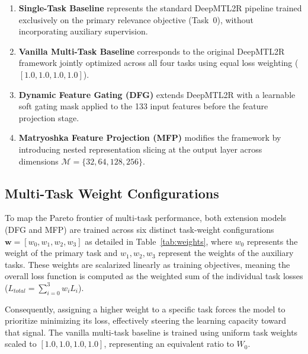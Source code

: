 \begin{enumerate}
    \item \textbf{Single-Task Baseline} represents the
    standard DeepMTL2R pipeline trained exclusively on
    the primary relevance objective (Task~0), without
    incorporating auxiliary supervision.

    \item \textbf{Vanilla Multi-Task Baseline}
    corresponds to the original DeepMTL2R framework
    jointly optimized across all four tasks using equal
    loss weighting ($[1.0, 1.0, 1.0, 1.0]$).

    \item \textbf{Dynamic Feature Gating (DFG)}
    extends DeepMTL2R with a learnable soft gating mask
    applied to the 133 input features before the feature
    projection stage.

    \item \textbf{Matryoshka Feature Projection (MFP)}
    modifies the framework by introducing nested
    representation slicing at the output layer across
    dimensions $\mathcal{M} = \{32, 64, 128, 256\}$.
\end{enumerate}

\subsection{Multi-Task Weight Configurations}

To map the Pareto frontier of multi-task performance, both extension models (DFG and MFP) are trained across six distinct task-weight configurations $\mathbf{w} = [w_0, w_1, w_2, w_3]$ as detailed in Table~\ref{tab:weights}, where $w_0$ represents the weight of the primary task and $w_1, w_2, w_3$ represent the weights of the auxiliary tasks. These weights are scalarized linearly as training objectives, meaning the overall loss function is computed as the weighted sum of the individual task losses ($L_{total} = \sum_{i=0}^{3} w_i L_i$).

Consequently, assigning a higher weight to a specific task forces the model to prioritize minimizing its loss, effectively steering the learning capacity toward that signal. The vanilla multi-task baseline is trained using uniform task weights scaled to $[1.0, 1.0, 1.0, 1.0]$, representing an equivalent ratio to $W_0$.

